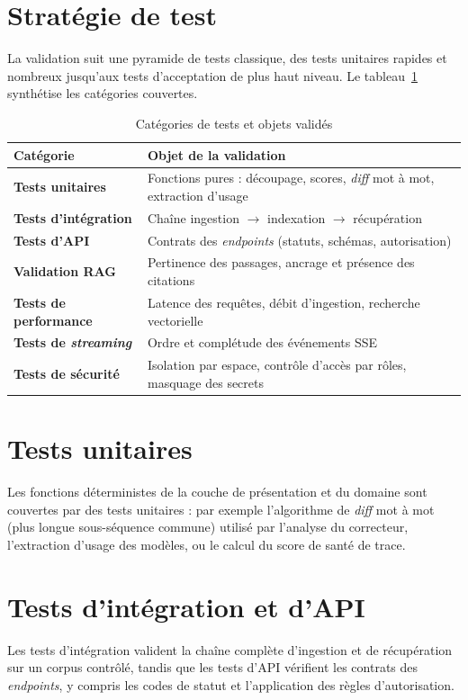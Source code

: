 \documentclass[12pt,a4paper,oneside]{report}
\begin{document}
\section{Stratégie de test}
La validation suit une pyramide de tests classique, des tests unitaires rapides
et nombreux jusqu'aux tests d'acceptation de plus haut niveau. Le
tableau~\ref{tab:tests} synthétise les catégories couvertes.

\begin{table}[H]
\centering
\caption{Catégories de tests et objets validés}
\label{tab:tests}
\small
\begin{tabularx}{\textwidth}{@{}>{\bfseries}l X@{}}
\toprule
Catégorie & Objet de la validation \\
\midrule
Tests unitaires & Fonctions pures : découpage, scores, \emph{diff} mot à mot, extraction d'usage \\
Tests d'intégration & Chaîne ingestion $\rightarrow$ indexation $\rightarrow$ récupération \\
Tests d'API & Contrats des \emph{endpoints} (statuts, schémas, autorisation) \\
Validation RAG & Pertinence des passages, ancrage et présence des citations \\
Tests de performance & Latence des requêtes, débit d'ingestion, recherche vectorielle \\
Tests de \emph{streaming} & Ordre et complétude des événements SSE \\
Tests de sécurité & Isolation par espace, contrôle d'accès par rôles, masquage des secrets \\
\bottomrule
\end{tabularx}
\end{table}

\section{Tests unitaires}
Les fonctions déterministes de la couche de présentation et du domaine sont
couvertes par des tests unitaires : par exemple l'algorithme de \emph{diff} mot à
mot (plus longue sous-séquence commune) utilisé par l'analyse du correcteur,
l'extraction d'usage des modèles, ou le calcul du score de santé de trace.

\section{Tests d'intégration et d'API}
Les tests d'intégration valident la chaîne complète d'ingestion et de
récupération sur un corpus contrôlé, tandis que les tests d'API vérifient les
contrats des \emph{endpoints}, y compris les codes de statut et l'application des
règles d'autorisation.
\end{document}
